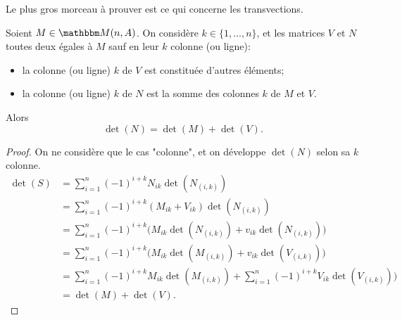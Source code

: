 Le plus gros morceau à prouver est ce qui concerne les transvections.
\begin{proposition}      \label{PROPooNGZJooHjtMyn}
    Soient \( M\in \eM(n,A)\). On considère \( k \in \{ 1, \dots , n \} \), et les matrices \( V \) et \( N \) toutes deux égales à \( M \) sauf en leur \( k \)\ieme{} colonne (ou ligne):
    \begin{itemize}
      \item la colonne (ou ligne) \( k \) de \( V \) est constituée d'autres éléments;
      \item la colonne (ou ligne) \( k \) de \( N \) est la somme des colonnes \( k \) de \( M \) et \(V\).
    \end{itemize}
    Alors
    \begin{equation}
        \det(N)=\det(M)+\det(V).
    \end{equation}
\end{proposition}

\begin{proof}
  On ne considère que le cas "colonne", et on développe \(\det(N) \) selon sa \( k\)\ieme{} colonne.
  \begin{subequations}
    \begin{align}
      \det(S) &= \sum_{i = 1}^n (-1)^{i+k} N_{ik} \det(N_{(i,k)})\\
              &= \sum_{i = 1}^n (-1)^{i+k} (M_{ik} + V_{ik}) \det(N_{(i,k)})\\
              &= \sum_{i = 1}^n (-1)^{i+k} \bigl(M_{ik} \det(N_{(i,k)})+ v_{ik} \det(N_{(i,k)})\bigr)\\             
              &= \sum_{i = 1}^n (-1)^{i+k} \bigl(M_{ik} \det(M_{(i,k)})+ v_{ik} \det(V_{(i,k)})\bigr)\\
              &= \sum_{i = 1}^n (-1)^{i+k} M_{ik} \det(M_{(i,k)}) + \sum_{i = 1}^n (-1)^{i+k} V_{ik} \det(V_{(i,k)})\bigr)\\
              &= \det(M) + \det(V).
    \end{align}
  \end{subequations}
 \end{proof}


